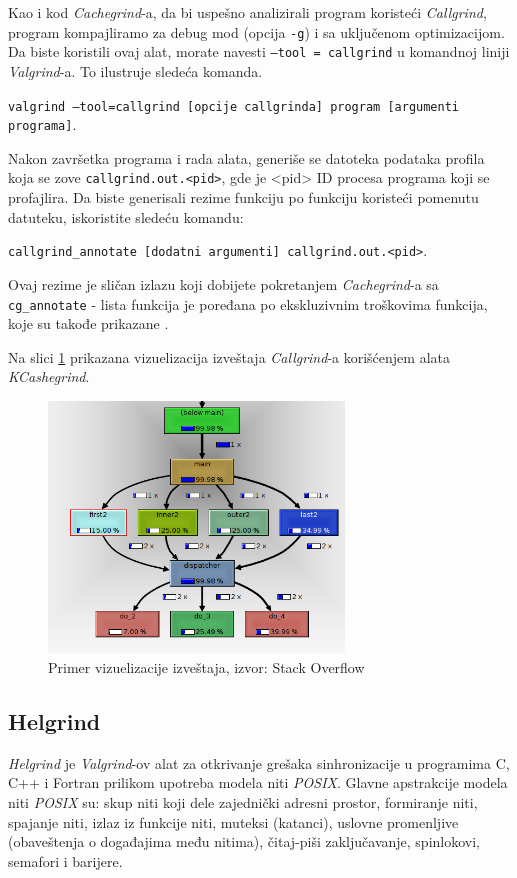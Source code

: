 \documentclass[12pt,oneside]{memoir}
\theoremstyle{plain}
\theoremstyle{definition}
\begin{document}
Kao i kod \textit{Cachegrind}-a, da bi uspešno analizirali program koristeći \textit{Callgrind}, program kompajliramo za debug mod (opcija \texttt{-g}) i sa uključenom optimizacijom. Da biste koristili ovaj alat, morate navesti \texttt{--tool = callgrind} u komandnoj liniji \textit{Valgrind}-a. To ilustruje sledeća komanda.
\begin{center}
\texttt{valgrind --tool=callgrind [opcije callgrinda] program [argumenti programa]}.
\end{center}

Nakon završetka programa i rada alata, generiše se datoteka podataka profila koja se zove \texttt{callgrind.out.<pid>}, gde je <pid> ID procesa programa koji se profajlira. Da biste generisali rezime funkciju po funkciju koristeći pomenutu datuteku, iskoristite sledeću komandu:
\begin{center}
\texttt{callgrind\_annotate [dodatni argumenti] callgrind.out.<pid>}.
\end{center}

Ovaj rezime je sličan izlazu koji dobijete  pokretanjem \textit{Cachegrind}-a sa \texttt{cg\_annotate} -  lista funkcija je poređana po ekskluzivnim troškovima funkcija, koje su takođe  prikazane \cite{Callgrind}. 

Na slici \ref{fig:slika2.18} prikazana vizuelizacija izveštaja \textit{Callgrind}-a korišćenjem alata \textit{KCashegrind}.
\begin{figure}[!ht]
  \centering
  \includegraphics[width=0.7\textwidth]{MUjHe.png}
  \caption{Primer vizuelizacije izveštaja, izvor: Stack Overflow}
  \label{fig:slika2.18}
\end{figure}

\subsection{Helgrind}\label{HelgrindSection}
\textit{Helgrind} je \textit{Valgrind}-ov alat za otkrivanje grešaka sinhronizacije u programima C, C++ i Fortran prilikom upotreba modela niti \textit{POSIX}. Glavne apstrakcije modela niti  \textit{POSIX} su: skup niti koji dele zajednički adresni prostor, formiranje niti, spajanje niti, izlaz iz funkcije niti, muteksi (katanci), uslovne promenljive (obaveštenja o događajima među nitima), čitaj-piši zaključavanje, spinlokovi, semafori i barijere.
\end{document}
